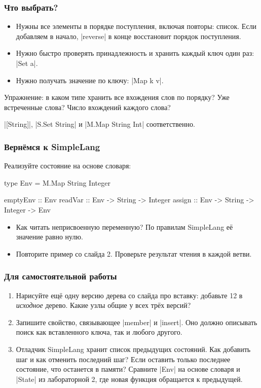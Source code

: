 \documentclass[11pt]{beamer}
\begin{document}
\begin{frame}[fragile]
  \frametitle{Что выбрать?}
  \begin{itemize}
    \item Нужны все элементы в порядке поступления, включая повторы: список. Если добавляем в начало, \haskinline|reverse| в конце восстановит порядок поступления.
    \item Нужно быстро проверять принадлежность и хранить каждый ключ один раз: \haskinline|Set a|.
    \item Нужно получать значение по ключу: \haskinline|Map k v|.
  \end{itemize}
  Упражнение: в каком типе хранить все вхождения слов по порядку? Уже встреченные слова? Число вхождений каждого слова? \pause

  \haskinline|[String]|, \haskinline|S.Set String| и \haskinline|M.Map String Int| соответственно.
\end{frame}

\begin{frame}[fragile]
  \frametitle{Вернёмся к SimpleLang}
  Реализуйте состояние на основе словаря:
  \begin{haskellsmall}
    type Env = M.Map String Integer

    emptyEnv :: Env
    readVar  :: Env -> String -> Integer
    assign   :: Env -> String -> Integer -> Env
  \end{haskellsmall}
  \begin{itemize}
    \item Как читать неприсвоенную переменную? По правилам SimpleLang её значение равно нулю.
    \item Повторите пример со слайда 2. Проверьте результат чтения в каждой ветви.
  \end{itemize}
\end{frame}

\begin{frame}[fragile]
  \frametitle{Для самостоятельной работы}
  \begin{enumerate}
    \item Нарисуйте ещё одну версию дерева со слайда про вставку: добавьте 12 в \emph{исходное} дерево. Какие узлы общие у всех трёх версий?
    \item Запишите свойство, связывающее \haskinline|member| и \haskinline|insert|. Оно должно описывать поиск как вставленного ключа, так и любого другого.
    \item Отладчик SimpleLang хранит список предыдущих состояний. Как добавить шаг и как отменить последний шаг? Если оставить только последнее состояние, что останется в памяти? Сравните \haskinline|Env| на основе словаря и \haskinline|State| из лабораторной 2, где новая функция обращается к предыдущей.
  \end{enumerate}
\end{frame}
\end{document}
